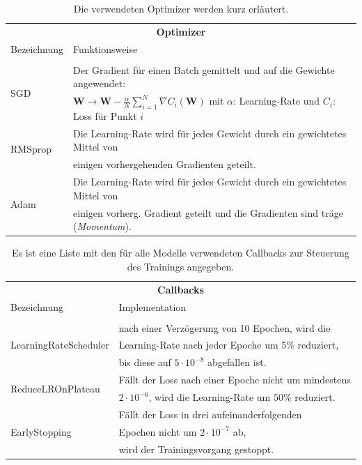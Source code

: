 \begin{table}
	\centering
	\caption{Die verwendeten Optimizer werden kurz erläutert.}
	\begin{tabular}{ll}
		\multicolumn{2}{c}{\textbf{Optimizer}} \\
		Bezeichnung & Funktionsweise \\
		\hline\\[-10pt]
		\multirow{2}{*}{SGD}& Der Gradient für einen Batch gemittelt und auf die Gewichte angewendet:\\
		&  $\textbf{W} \rightarrow \textbf{W} - \frac{\alpha}{N}\sum_{i=1}^{N}\nabla C_i(\textbf{W})$ mit $\alpha$: Learning-Rate und $C_i$: Loss für Punkt $i$ \\[5pt]
		\multirow{2}{*}{RMSprop \cite{RMSprop}} & Die Learning-Rate wird für jedes Gewicht durch ein gewichtetes Mittel von \\
		& einigen vorhergehenden Gradienten geteilt. \\[5pt]
		\multirow{2}{*}{Adam \cite{Adam}} & Die Learning-Rate wird für jedes Gewicht durch ein gewichtetes Mittel von \\
		&einigen vorherg. Gradient geteilt und die Gradienten sind träge (\textit{Momentum}). \\
		\hline 
	\end{tabular}
	\label{optimizer}
\end{table}
\begin{table}
	\centering
	\caption{Es ist eine Liste mit den für alle Modelle verwendeten Callbacks zur Steuerung des Trainings angegeben.}
	\begin{tabular}{ll}
		\multicolumn{2}{c}{\textbf{Callbacks}} \\[5pt]
		Bezeichnung & Implementation\\
		\hline\\[-10pt]
		\multirow{3}{*}{LearningRateScheduler} & nach einer Verzögerung von 10 Epochen, wird die \\
		& Learning-Rate nach jeder Epoche um $5\%$ reduziert, \\
		& bis diese auf $5 \cdot 10^{-8}$ abgefallen ist. \\[5pt]
		\multirow{2}{*}{ReduceLROnPlateau}& Fällt der Loss nach einer Epoche nicht um mindestens\\
		& $2 \cdot 10^{-6}$, wird die Learning-Rate um $50\%$ reduziert.\\[5pt]
		\multirow{3}{*}{EarlyStopping}& Fällt der Loss in drei aufeinanderfolgenden \\
		& Epochen nicht um $2 \cdot 10^{-7}$ ab, \\
		& wird der Trainingsvorgang gestoppt.\\
		\hline
	\end{tabular}
	\label{Callbacks}
\end{table}
